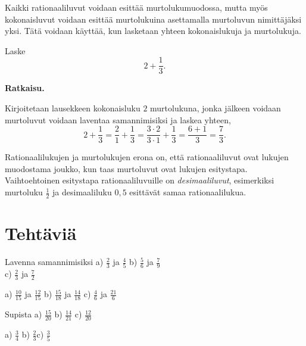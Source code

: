     Kaikki rationaaliluvut voidaan esittää murtolukumuodossa, mutta myös
    kokonaisluvut voidaan esittää murtolukuina asettamalla murtoluvun
    nimittäjäksi yksi. Tätä voidaan käyttää, kun lasketaan yhteen
    kokonaislukuja ja murtolukuja.
    
    \begin{esimerkki}
        Laske
        \[
            2 + \frac{1}{3}.
        \]
        
        \textbf{Ratkaisu.}
        
		Kirjoitetaan lausekkeen kokonaisluku $2$ murtolukuna, jonka
		jälkeen voidaan murtoluvut voidaan laventaa samannimisiksi
		ja laskea yhteen,
        \[
            2 + \frac{1}{3} =
            \frac{2}{1} + \frac{1}{3} =
            \frac{3 \cdot 2}{3 \cdot 1} + \frac{1}{3} =
            \frac{6+1}{3} =
            \frac{7}{3}.
        \]
    \end{esimerkki}
    
    Rationaalilukujen ja murtolukujen erona on, että rationaaliluvut
    ovat lukujen muodostama joukko, kun taas murtoluvut ovat lukujen esitystapa.
    Vaihtoehtoinen esitystapa rationaaliluvuille on \emph{desimaaliluvut},
    esimerkiksi murtoluku $\frac{1}{2}$ ja desimaaliluku $0,5$
    esittävät samaa rationaalilukua.
    


\section*{Tehtäviä}

\begin{tehtava}

Lavenna samannimisiksi \quad
a) $\frac{2}{3}$ ja $\frac{4}{5}$ \quad b) $\frac{5}{6}$ ja $\frac{7}{9}$ \quad \\ c) $\frac{2}{3}$ ja $\frac{7}{2}$ 
\begin{vastaus}
a) $\frac{10}{15}$ ja $\frac{12}{15}$ \qquad b) $\frac{15}{18}$ ja $\frac{14}{18}$ \qquad c) $\frac{4}{6}$ ja $\frac{21}{6}$
\end{vastaus}
\end{tehtava}

\begin{tehtava}
Supista \quad
a) $\frac{15}{20}$ \qquad b) $\frac{14}{21}$ \qquad c) $\frac{12}{20}$
\begin{vastaus}
a) $\frac{3}{4}$ \qquad b) $\frac{2}{3}$\qquad c) $\frac{3}{5}$
\end{vastaus}
\end{tehtava}

